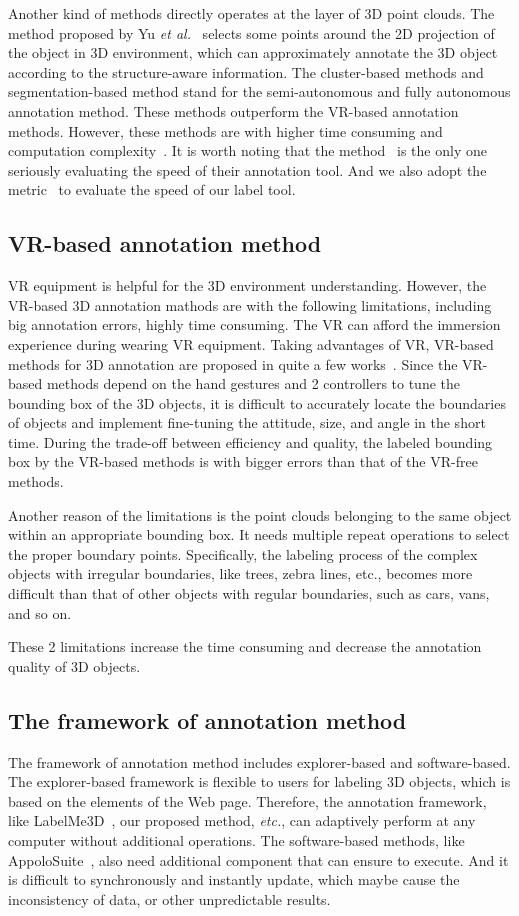 \documentclass[letterpaper, 10 pt, conference]{ieeeconf}  %
\begin{document}
Another kind of methods directly operates at the layer of 3D point clouds.
The method proposed by Yu \textit{et al.}~\cite{yu2012efficient} selects some points around the 2D projection of the object in 3D environment, which can approximately annotate the 3D object according to the structure-aware information. The cluster-based methods and segmentation-based method stand for the semi-autonomous and fully autonomous annotation method.
These methods outperform the VR-based annotation methods. However, these methods are with higher time consuming and computation complexity~\cite{pointatme}. It is worth noting that the method~\cite{monica2017multi} is the only one seriously evaluating the speed of their annotation tool. And we also adopt the metric~\cite{monica2017multi} to evaluate the speed of our label tool.
\subsection{VR-based annotation method}
VR equipment is helpful for the 3D environment understanding. However, the VR-based 3D annotation mathods are with the following limitations, including big annotation errors, highly time consuming. The VR can afford the immersion experience during wearing VR equipment. Taking advantages of VR, VR-based methods for 3D annotation are proposed in quite a few works~\cite{pointatme,wilkes20123dVR,coffey2011interactiveVR}. Since the VR-based methods depend on the hand gestures and 2 controllers to tune the bounding box of the 3D objects, it is difficult to accurately locate the boundaries of objects and implement fine-tuning the attitude, size, and angle in the short time. During the trade-off between efficiency and quality, the labeled bounding box by the VR-based methods is with bigger errors than that of the VR-free methods.

Another reason of the limitations is the point clouds belonging to the same object within an appropriate bounding box.
It needs multiple repeat operations to select the proper boundary points.
Specifically, the labeling process of the complex objects with irregular boundaries, like trees, zebra lines, etc., becomes more difficult than that of other objects with regular boundaries, such as cars, vans, and so on.

These 2 limitations increase the time consuming and decrease the annotation quality of 3D objects.
\subsection{The framework of annotation method}
The framework of annotation method includes explorer-based and software-based. The explorer-based framework is flexible to users for labeling 3D objects, which is based on the elements of the Web page. Therefore, the annotation framework, like LabelMe3D~\cite{LabelMe3D}, our proposed method, \emph{etc.}, can adaptively perform at any computer without additional operations. The software-based methods, like AppoloSuite~\cite{SUPERVISELY,wang2019apolloscape}, also need additional component that can ensure to execute. And it is difficult to synchronously and instantly update, which maybe cause the inconsistency of data, or other unpredictable results.
\end{document}
